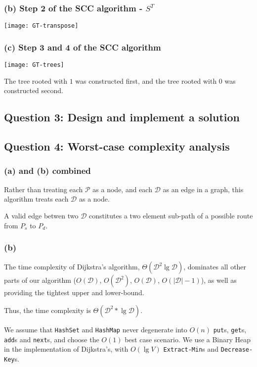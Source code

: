 \documentclass[11pt,a4paper]{article}
\begin{document}
\subsubsection*{(b) Step 2 of the SCC algorithm - $S^T$}

\texttt{[image: GT-transpose]}

\subsubsection*{(c) Step 3 and 4 of the SCC algorithm}

\texttt{[image: GT-trees]}

The tree rooted with $1$ was constructed first, and the tree rooted with $0$ was constructed second.

\newpage

\subsection*{Question 3: Design and implement a solution}

\subsection*{Question 4: Worst-case complexity analysis}


\subsubsection*{(a) and (b) combined}

Rather than treating each $\mathcal{P}$ as a node, and each $\mathcal{D}$ as an edge in a graph, this algorithm treats each $\mathcal{D}$ as a node. 

A valid edge betwen two $\mathcal{D}$ constitutes a two element sub-path of a possible route from $P_s$ to $P_d$.

\newpage

\begingroup
\fontsize{11pt}{11pt}\selectfont
 
\endgroup

\subsubsection*{(b)}

The time complexity of Dijkstra's algorithm, $\Theta(\mathcal{D}^2 \lg \mathcal{D})$, dominates all other parts of our algorithm ($O(\mathcal{D})$, $O(\mathcal{D}^2)$, $O(\mathcal{D})$, $O(\mathcal{\vert D \vert - 1})$), as well as providing the tightest upper and lower-bound.


Thus, the time complexity is $\Theta(\mathcal{D}^2 * \lg \mathcal{D})$.

We assume that \texttt{HashSet} and \texttt{HashMap} never degenerate into $O(n)$ \texttt{put}s, \texttt{get}s, \texttt{add}s and \texttt{next}s, and choose the $O(1)$ best case scenario. We use a Binary Heap in the implementation of Dijkstra's, with $O(\lg V)$ \texttt{Extract-Min}s and \texttt{Decrease-Key}s.
\end{document}
